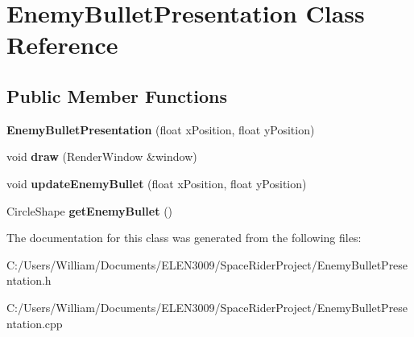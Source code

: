 \hypertarget{class_enemy_bullet_presentation}{}\section{Enemy\+Bullet\+Presentation Class Reference}
\label{class_enemy_bullet_presentation}
\subsection*{Public Member Functions}
\begin{DoxyCompactItemize}
\item 
\mbox{\label{class_enemy_bullet_presentation_a650d6adb9afd73ec43d91791919e9797}} 
{\bfseries Enemy\+Bullet\+Presentation} (float x\+Position, float y\+Position)
\item 
\mbox{\label{class_enemy_bullet_presentation_ab47308a4c94cd9ee4c16f0b528a9c77b}} 
void {\bfseries draw} (Render\+Window \&window)
\item 
\mbox{\label{class_enemy_bullet_presentation_a89cf545e80590e548f9f32dcce8edc98}} 
void {\bfseries update\+Enemy\+Bullet} (float x\+Position, float y\+Position)
\item 
\mbox{\label{class_enemy_bullet_presentation_a38b81cebcff8e858e6cbaf8df7a6fa23}} 
Circle\+Shape {\bfseries get\+Enemy\+Bullet} ()
\end{DoxyCompactItemize}


The documentation for this class was generated from the following files\+:\begin{DoxyCompactItemize}
\item 
C\+:/\+Users/\+William/\+Documents/\+E\+L\+E\+N3009/\+Space\+Rider\+Project/Enemy\+Bullet\+Presentation.\+h\item 
C\+:/\+Users/\+William/\+Documents/\+E\+L\+E\+N3009/\+Space\+Rider\+Project/Enemy\+Bullet\+Presentation.\+cpp\end{DoxyCompactItemize}
